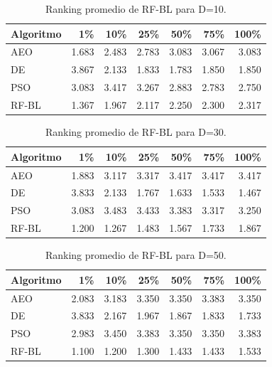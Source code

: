 \documentclass[11pt,a4paper]{article}
\begin{document}
\begin{table}[h!]
\centering \caption{Ranking promedio de RF-BL para D=10.} \label{tab:rfbl_d10}
\begin{tabular}{lrrrrrr} 
    \toprule Algoritmo & 1\% & 10\% & 25\% & 50\% & 75\% & 100\% \\ 
    \midrule AEO   & 1.683 & 2.483 & 2.783 & 3.083 & 3.067 & 3.083 \\ 
    DE    & 3.867 & 2.133 & 1.833 & 1.783 & 1.850 & 1.850 \\ 
    PSO   & 3.083 & 3.417 & 3.267 & 2.883 & 2.783 & 2.750 \\ 
    RF-BL & 1.367 & 1.967 & 2.117 & 2.250 & 2.300 & 2.317 \\ 
    \bottomrule \end{tabular} \end{table}
\begin{table}[h!]
\centering \caption{Ranking promedio de RF-BL para D=30.} \label{tab:rfbl_d30}
\begin{tabular}{lrrrrrr} 
    \toprule Algoritmo & 1\% & 10\% & 25\% & 50\% & 75\% & 100\% \\ 
    \midrule AEO   & 1.883 & 3.117 & 3.317 & 3.417 & 3.417 & 3.417 \\ 
    DE    & 3.833 & 2.133 & 1.767 & 1.633 & 1.533 & 1.467 \\ 
    PSO   & 3.083 & 3.483 & 3.433 & 3.383 & 3.317 & 3.250 \\ 
    RF-BL & 1.200 & 1.267 & 1.483 & 1.567 & 1.733 & 1.867 \\ 
    \bottomrule \end{tabular} \end{table}
\begin{table}[h!]
\centering \caption{Ranking promedio de RF-BL para D=50.} \label{tab:rfbl_d50}
\begin{tabular}{lrrrrrr} 
    \toprule Algoritmo & 1\% & 10\% & 25\% & 50\% & 75\% & 100\% \\ 
    \midrule AEO   & 2.083 & 3.183 & 3.350 & 3.350 & 3.383 & 3.350 \\ 
    DE    & 3.833 & 2.167 & 1.967 & 1.867 & 1.833 & 1.733 \\ 
    PSO   & 2.983 & 3.450 & 3.383 & 3.350 & 3.350 & 3.383 \\ 
    RF-BL & 1.100 & 1.200 & 1.300 & 1.433 & 1.433 & 1.533 \\ 
    \bottomrule \end{tabular} \end{table}
\end{document}
